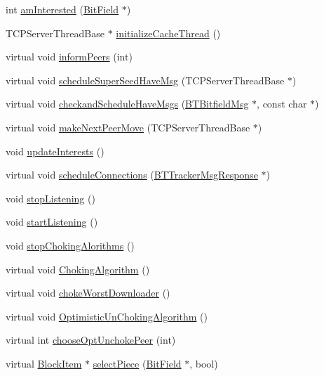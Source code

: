\begin{DoxyCompactItemize}
\item 
int \hyperlink{classBTPeerWireBase_aed1b611d84031494e55da3cfed0d38f1}{am\+Interested} (\hyperlink{classBitField}{Bit\+Field} $\ast$)
\item 
T\+C\+P\+Server\+Thread\+Base $\ast$ \hyperlink{classBTPeerWireBase_a7e2401afda7eb4d9e51e3bec259f110f}{initialize\+Cache\+Thread} ()
\item 
virtual void \hyperlink{classBTPeerWireBase_ab6edc706a0c799b7dbd1d05f69007d78}{inform\+Peers} (int)
\item 
virtual void \hyperlink{classBTPeerWireBase_aa9e58e68585e760accc3eb8466ef3e26}{schedule\+Super\+Seed\+Have\+Msg} (T\+C\+P\+Server\+Thread\+Base $\ast$)
\item 
virtual void \hyperlink{classBTPeerWireBase_a12abf7046049a31525e72edf3f21c749}{checkand\+Schedule\+Have\+Msgs} (\hyperlink{classBTBitfieldMsg}{B\+T\+Bitfield\+Msg} $\ast$, const char $\ast$)
\item 
virtual void \hyperlink{classBTPeerWireBase_ae475ea57dc6493b3966606a361dd6c75}{make\+Next\+Peer\+Move} (T\+C\+P\+Server\+Thread\+Base $\ast$)
\item 
void \hyperlink{classBTPeerWireBase_a11ebbc7ea240c2f926b5a417d78ec872}{update\+Interests} ()
\item 
virtual void \hyperlink{classBTPeerWireBase_a63cab614f3b8b6dc45cbaea9c83a9667}{schedule\+Connections} (\hyperlink{classBTTrackerMsgResponse}{B\+T\+Tracker\+Msg\+Response} $\ast$)
\item 
void \hyperlink{classBTPeerWireBase_a8345d9e6dbecc9b468b399d9abab3443}{stop\+Listening} ()
\item 
void \hyperlink{classBTPeerWireBase_a04accb49268464353db3163ef531285e}{start\+Listening} ()
\item 
void \hyperlink{classBTPeerWireBase_ac4af5dc7161abe213c9b094ad05fca20}{stop\+Choking\+Alorithms} ()
\item 
virtual void \hyperlink{classBTPeerWireBase_aa75fedc2c61505a7297cf49220884207}{Choking\+Algorithm} ()
\item 
virtual void \hyperlink{classBTPeerWireBase_a19aa23680757719101150a776ed2f554}{choke\+Worst\+Downloader} ()
\item 
virtual void \hyperlink{classBTPeerWireBase_a0daabdae004f8ae00d1713b355faed29}{Optimistic\+Un\+Choking\+Algorithm} ()
\item 
virtual int \hyperlink{classBTPeerWireBase_ad2fa17f7c1edd3a810a2096fe7b9628d}{choose\+Opt\+Unchoke\+Peer} (int)
\item 
virtual \hyperlink{classBlockItem}{Block\+Item} $\ast$ \hyperlink{classBTPeerWireBase_ad7505fecedb42835e9b17277678cdec5}{select\+Piece} (\hyperlink{classBitField}{Bit\+Field} $\ast$, bool)

\end{DoxyCompactItemize}
